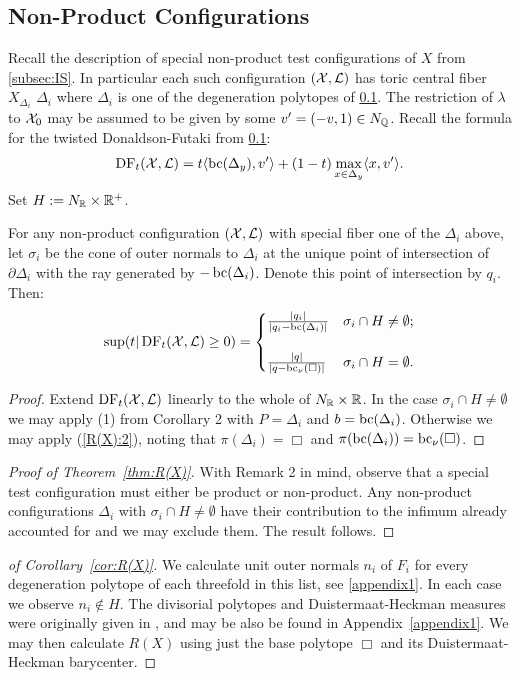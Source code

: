 \subsection{Non-Product Configurations}
Recall the description of special non-product test configurations of \(X\) from \ref{subsec:IS}. In particular each such configuration \(({\mathcal{X}},\mathcal{L})\) has toric central fiber \(X_{\Delta_i}\) \(\Delta_i\) where \(\Delta_i\) is one of the degeneration polytopes of \ref{}. The restriction of \(\lambda\) to \({\mathcal{X}}_0\) may be assumed to be given by some \(v' = (-v,1) \in N_{\mathbb{Q}} \). Recall the formula for the twisted Donaldson-Futaki from \ref{}:
\[
\mathop{\rm DF}\nolimits_t( {\mathcal{X}}, \mathcal{L} )  = t \langle \mathop{\rm bc}\nolimits(\Delta_y), v' \rangle + (1-t) \max_{x \in \Delta_y} \langle x, v' \rangle.
\]
Set \(H := N_{\mathbb{R}} \times \mathbb{R}^+\).
\begin{proposition}
For any non-product configuration \(({\mathcal{X}},\mathcal{L})\) with special fiber one of the \(\Delta_i\) above, let \(\sigma_i\) be the cone of outer normals to \(\Delta_i\) at the unique point of intersection of \(\partial \Delta_i\) with the ray generated by \(-\mathop{\rm bc}\nolimits(\Delta_i)\). Denote this point of intersection by \(q_i\). Then:
\[
\sup(t | \mathop{\rm DF}\nolimits_t({\mathcal{X}},\mathcal{L}) \ge 0) =\begin{cases} 
     \frac{|q_i|}{|q_i - \mathop{\rm bc}\nolimits(\Delta_i)|} & \sigma_i \cap H \neq \emptyset ;\\ \\
      \frac{|q|}{|q-\mathop{\rm bc}\nolimits_\nu(\Box)|} & \sigma_i \cap H = \emptyset.
   \end{cases}
\]
\end{proposition}
\begin{proof}
Extend \(\mathop{\rm DF}\nolimits_t({\mathcal{X}},\mathcal{L})\) linearly to the whole of \(N_{\mathbb{R}} \times \mathbb{R}\). In the case \(\sigma_i \cap H \neq \emptyset\) we may apply (1) from Corollary 2 with \(P = \Delta_i\) and \(b = \mathop{\rm bc}\nolimits(\Delta_i)\). Otherwise we may apply (\ref{R(X):2}), noting that \(\pi(\Delta_i) = \Box\) and \(\pi(\mathop{\rm bc}\nolimits(\Delta_i)) = \mathop{\rm bc}\nolimits_\nu( \Box)\).
\end{proof}
\begin{proof}[Proof of Theorem~\ref{thm:R(X)}]
With Remark 2 in mind, observe that a special test configuration must either be product or non-product. Any non-product configurations \(\Delta_i\) with \(\sigma_i \cap H \neq \emptyset\) have their contribution to the infimum already accounted for and we may exclude them. The result follows.
\end{proof}
\begin{proof}[of Corollary~\ref{cor:R(X)}]
We calculate unit outer normals \(n_i \) of \(F_i\) for every degeneration polytope of each threefold in this list, see \ref{appendix1}. In each case we observe \(n_i \notin H\). The divisorial polytopes and Duistermaat-Heckman measures were originally given in \cite{suss2013fano}, and may be also be found in Appendix~\ref{appendix1}. We may then calculate \(R(X)\) using just the base polytope \(\Box\) and its Duistermaat-Heckman barycenter.
\end{proof}